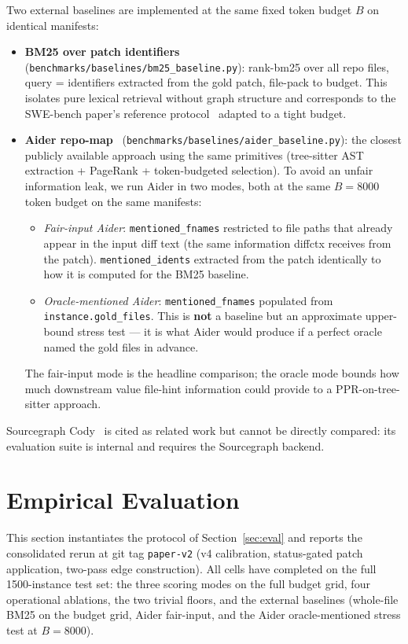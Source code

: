 \documentclass[11pt, a4paper]{article}
\begin{document}
Two external baselines are implemented at the same fixed token budget $B$ on identical manifests:
\begin{itemize}
    \item \textbf{BM25 over patch identifiers} (\texttt{benchmarks/baselines/bm25\_baseline.py}): rank-bm25 over all repo files, query = identifiers extracted from the gold patch, file-pack to budget. This isolates pure lexical retrieval without graph structure and corresponds to the SWE-bench paper's reference protocol~\cite{jimenez2024swebench} adapted to a tight budget.
    \item \textbf{Aider repo-map}~\cite{aider2023repomap} (\texttt{benchmarks/baselines/aider\_baseline.py}): the closest publicly available approach using the same primitives (tree-sitter AST extraction + PageRank + token-budgeted selection). To avoid an unfair information leak, we run Aider in two modes, both at the same $B{=}8000$ token budget on the same manifests:
    \begin{itemize}
        \item \emph{Fair-input Aider}: \texttt{mentioned\_fnames} restricted to file paths that already appear in the input diff text (the same information diffctx receives from the patch). \texttt{mentioned\_idents} extracted from the patch identically to how it is computed for the BM25 baseline.
        \item \emph{Oracle-mentioned Aider}: \texttt{mentioned\_fnames} populated from \texttt{instance.gold\_files}. This is \textbf{not} a baseline but an approximate upper-bound stress test --- it is what Aider would produce if a perfect oracle named the gold files in advance.
    \end{itemize}
    The fair-input mode is the headline comparison; the oracle mode bounds how much downstream value file-hint information could provide to a PPR-on-tree-sitter approach.
\end{itemize}
Sourcegraph Cody~\cite{hartman2024recsys} is cited as related work but cannot be directly compared: its evaluation suite is internal and requires the Sourcegraph backend.

\newpage
\section{Empirical Evaluation}
\label{sec:prelim-results}

This section instantiates the protocol of Section~\ref{sec:eval} and reports the consolidated rerun at git tag \texttt{paper-v2} (v4 calibration, status-gated patch application, two-pass edge construction). All cells have completed on the full 1500-instance test set: the three scoring modes on the full budget grid, four operational ablations, the two trivial floors, and the external baselines (whole-file BM25 on the budget grid, Aider fair-input, and the Aider oracle-mentioned stress test at $B{=}8000$).
\end{document}
